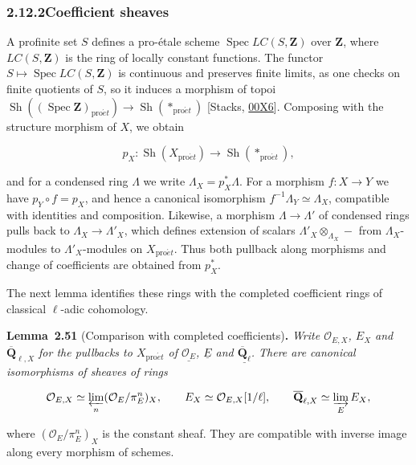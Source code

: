 \documentclass[11pt]{article}
\newenvironment{bpstatement}[2]{\par\addvspace{0.6\baselineskip}\noindent\textbf{#1}#2\textbf{.}\enspace\ignorespaces}
  {\par\addvspace{0.4\baselineskip}}
\newenvironment{bpstatementit}[2]{\begin{bpstatement}{#1}{#2}\itshape\ignorespaces}{\end{bpstatement}}
\providecommand{\QbarX}{}\renewcommand{\QbarX}{\overline{\mathbf Q}_{\ell,X}}
\providecommand{\Sh}{}\renewcommand{\Sh}{\operatorname{Sh}}
\begin{document}
\subsubsection*{\texorpdfstring{2.12.2\quad Coefficient sheaves}{2.12.2 Coefficient sheaves}}
\label{bp156}%
\label{bp157}%
A profinite set \(S\) defines a pro-étale scheme \(\operatorname{Spec}LC(S,\mathbf Z)\) over \(\mathbf Z\), where \(LC(S,\mathbf Z)\) is the ring of locally constant functions. The functor \(S\mapsto\operatorname{Spec}LC(S,\mathbf Z)\) is continuous and preserves finite limits, as one checks on finite quotients of \(S\), so it induces a morphism of topoi \(\Sh((\operatorname{Spec}\mathbf Z)_{\mathrm{pro}\acute{e}t})\to
\Sh(*_{\mathrm{pro}\acute{e}t})\) [Stacks, \href{https://stacks.math.columbia.edu/tag/00X6}{00X6}]. Composing with the structure morphism of \(X\), we obtain

\[
p_X:\Sh(X_{\mathrm{pro}\acute{e}t})\longrightarrow\Sh(*_{\mathrm{pro}\acute{e}t}),
\]

and for a condensed ring \(\Lambda\) we write \(\Lambda_X=p_X^*\Lambda\). For a morphism \(f:X\to Y\) we have \(p_Y\circ f=p_X\), and hence a canonical isomorphism \(f^{-1}\Lambda_Y\simeq\Lambda_X\), compatible with identities and composition. Likewise, a morphism \(\Lambda\to\Lambda'\) of condensed rings pulls back to \(\Lambda_X\to\Lambda'_X\), which defines extension of scalars \(\Lambda'_X\otimes_{\Lambda_X}-\) from \(\Lambda_X\)-modules to \(\Lambda'_X\)-modules on \(X_{\mathrm{pro}\acute{e}t}\). Thus both pullback along morphisms and change of coefficients are obtained from \(p_X^*\).

The next lemma identifies these rings with the completed coefficient rings of classical \(\ell\)-adic cohomology.

\label{bp158}%
\begin{bpstatementit}{Lemma~2.51}{ (Comparison with completed coefficients)}
Write \(\mathcal O_{E,X}\), \(E_X\) and \(\QbarX\) for the pullbacks to \(X_{\mathrm{pro}\acute{e}t}\) of \(\underline{\mathcal O_E}\), \(\underline E\) and \(\underline{\overline{\mathbf Q}_\ell}\). There are canonical isomorphisms of sheaves of rings

\[
\mathcal O_{E,X}\simeq\varprojlim_n(\mathcal O_E/\pi_E^n)_X,
\qquad E_X\simeq\mathcal O_{E,X}[1/\ell],
\qquad \QbarX\simeq\varinjlim_E E_X,
\]

where \((\mathcal O_E/\pi_E^n)_X\) is the constant sheaf. They are compatible with inverse image along every morphism of schemes.
\end{bpstatementit}
\end{document}
